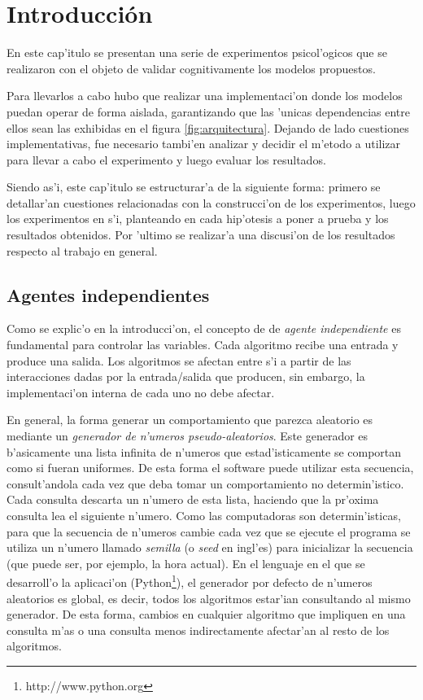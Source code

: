 \section{Introducci\'on}
En este cap'itulo se presentan una serie de experimentos psicol'ogicos que se realizaron con el objeto de validar cognitivamente los modelos propuestos.

Para llevarlos a cabo hubo que 
realizar una implementaci'on donde los modelos puedan operar de forma aislada, garantizando que las 'unicas dependencias 
entre ellos sean las exhibidas en el figura \ref{fig:arquitectura}. Dejando de lado cuestiones implementativas, 
fue necesario tambi'en analizar y decidir el m'etodo a utilizar para llevar a cabo el experimento y luego evaluar los resultados.

Siendo as'i, este cap'itulo se estructurar'a de la siguiente forma: primero se detallar'an cuestiones relacionadas con 
la construcci'on de los experimentos, luego los experimentos en s'i, planteando en cada hip'otesis a poner a prueba y los
resultados obtenidos.
Por 'ultimo se realizar'a una discusi'on de los resultados respecto al trabajo en general.

\subsection{Agentes independientes}
Como se explic'o en la introducci'on, el concepto de de \emph{agente independiente} es fundamental para controlar las variables. 
Cada algoritmo recibe una entrada y produce una salida. Los algoritmos se afectan entre s'i a partir de las 
interacciones dadas por la entrada/salida que producen, sin embargo, la implementaci'on interna de cada uno
no debe afectar. 

En general, la forma generar un comportamiento que parezca aleatorio es mediante un \emph{generador de n'umeros pseudo-aleatorios}. 
Este generador es b'asicamente una lista infinita de n'umeros que estad'isticamente se comportan como si fueran uniformes. 
De esta forma el software puede utilizar esta secuencia, consult'andola cada vez que deba tomar un comportamiento no determin'istico. 
Cada consulta descarta un n'umero de esta lista, haciendo que la pr'oxima consulta lea el siguiente n'umero. 
Como las computadoras son determin'isticas, para que la secuencia de n'umeros cambie cada vez que se ejecute el programa se utiliza un n'umero 
llamado \emph{semilla} (o \emph{seed} en ingl'es) para inicializar la secuencia (que puede ser, por ejemplo, la hora actual). 
En el lenguaje en el que se desarroll'o la aplicaci'on (Python\footnote{http://www.python.org}), el generador por defecto de n'umeros aleatorios 
es global, es decir, todos los algoritmos estar'ian consultando al mismo generador. De esta forma, cambios en cualquier algoritmo que impliquen en 
una consulta m'as o una consulta menos indirectamente afectar'an al resto de los algoritmos.


